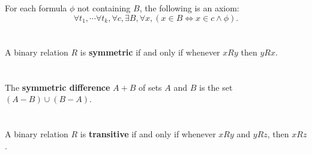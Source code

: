 \documentclass{report}
\begin{document}
For each formula $\phi$ not containing $B$, the following is an axiom:
  $$\forall t_1, \cdots \forall t_k, \forall c,
      \exists B, \forall x, (x \in B \iff x \in c \land \phi).$$

\begin{axiom}


\end{axiom}

\section{}%
\label{ref:symmetric}

A binary relation $R$ is \textbf{symmetric} if and only if whenever $xRy$ then
  $yRx$.

\begin{definition}


\end{definition}

\section{}%
\label{ref:symmetric-difference}

The \textbf{symmetric difference} $A + B$ of sets $A$ and $B$ is the set
  $(A - B) \cup (B - A)$.

\begin{definition}


\end{definition}

\section{}%
\label{ref:transitive}

A binary relation $R$ is \textbf{transitive} if and only if whenever $xRy$ and
  $yRz$, then $xRz$.

\begin{definition}


\end{definition}

\section{}%
\label{ref:union-axiom}
\end{document}

